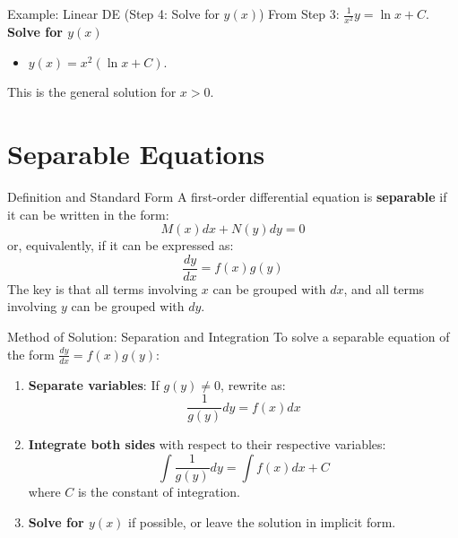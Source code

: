 \documentclass[10pt,aspectratio=169]{beamer}
\begin{document}
\begin{frame}{Example: Linear DE (Step 4: Solve for $y(x)$)}
    From Step 3: $\frac{1}{x^2}y = \ln x + C$.
    \vspace{1em}
    \textbf{Solve for $y(x)$}
    \begin{itemize}
        \item $y(x) = x^2(\ln x + C)$.
    \end{itemize}
    This is the general solution for $x > 0$.
\end{frame}

\section{Separable Equations}

\begin{frame}{Definition and Standard Form}
    A first-order differential equation is \textbf{separable} if it can be written in the form:
    \begin{equation}
        M(x)dx + N(y)dy = 0
        \label{eq:separable_form1}
    \end{equation}
    or, equivalently, if it can be expressed as:
    \begin{equation}
        \frac{dy}{dx} = f(x)g(y)
        \label{eq:separable_form2}
    \end{equation}
    The key is that all terms involving $x$ can be grouped with $dx$, and all terms involving $y$ can be grouped with $dy$.
\end{frame}

\begin{frame}{Method of Solution: Separation and Integration}
    To solve a separable equation of the form $\frac{dy}{dx} = f(x)g(y)$:
    \begin{enumerate}
        \item \textbf{Separate variables}: If $g(y) \neq 0$, rewrite as:
        \begin{equation}
            \frac{1}{g(y)}dy = f(x)dx
        \end{equation}
        \item \textbf{Integrate both sides} with respect to their respective variables:
        \begin{equation}
            \int \frac{1}{g(y)}dy = \int f(x)dx + C
            \label{eq:separable_solution}
        \end{equation}
        where $C$ is the constant of integration.
        \item \textbf{Solve for $y(x)$} if possible, or leave the solution in implicit form.
    \end{enumerate}
\end{frame}
\end{document}
